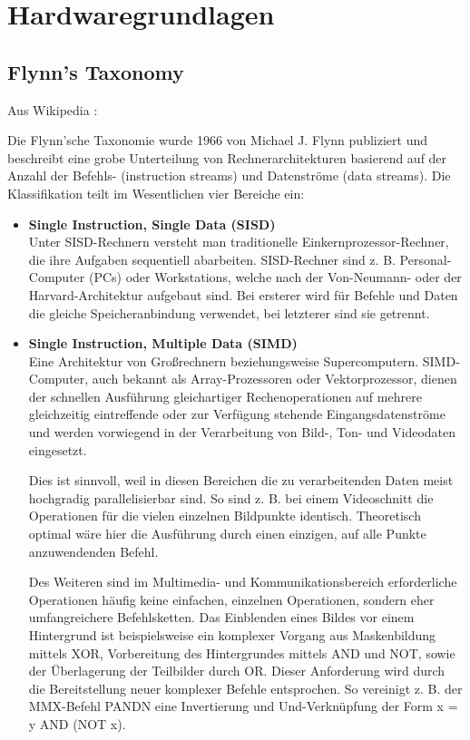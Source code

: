 	\chapter{Hardwaregrundlagen}
		\section{Flynn's Taxonomy}
		Aus Wikipedia \autocite{wikiFT}:
		
		Die Flynn’sche Taxonomie wurde 1966 von Michael J. Flynn publiziert und beschreibt eine grobe Unterteilung von Rechnerarchitekturen basierend auf der Anzahl der Befehls- (instruction streams) und Datenströme (data streams). Die Klassifikation teilt im Wesentlichen vier Bereiche ein:
		\begin{itemize}
		\item \textbf{Single Instruction, Single Data (SISD)}\\ Unter SISD-Rechnern versteht man traditionelle Einkernprozessor-Rechner, die ihre Aufgaben sequentiell abarbeiten. SISD-Rechner sind z. B. Personal-Computer (PCs) oder Workstations, welche nach der Von-Neumann- oder der Harvard-Architektur aufgebaut sind. Bei ersterer wird für Befehle und Daten die gleiche Speicheranbindung verwendet, bei letzterer sind sie getrennt. 
		
		\item \textbf{Single Instruction, Multiple Data (SIMD)}\\ Eine Architektur von Großrechnern beziehungsweise Supercomputern. SIMD-Computer, auch bekannt als Array-Prozessoren oder Vektorprozessor, dienen der schnellen Ausführung gleichartiger Rechenoperationen auf mehrere gleichzeitig eintreffende oder zur Verfügung stehende Eingangsdatenströme und werden vorwiegend in der Verarbeitung von Bild-, Ton- und Videodaten eingesetzt.

Dies ist sinnvoll, weil in diesen Bereichen die zu verarbeitenden Daten meist hochgradig parallelisierbar sind. So sind z. B. bei einem Videoschnitt die Operationen für die vielen einzelnen Bildpunkte identisch. Theoretisch optimal wäre hier die Ausführung durch einen einzigen, auf alle Punkte anzuwendenden Befehl.

Des Weiteren sind im Multimedia- und Kommunikationsbereich erforderliche Operationen häufig keine einfachen, einzelnen Operationen, sondern eher umfangreichere Befehlsketten. Das Einblenden eines Bildes vor einem Hintergrund ist beispielsweise ein komplexer Vorgang aus Maskenbildung mittels XOR, Vorbereitung des Hintergrundes mittels AND und NOT, sowie der Überlagerung der Teilbilder durch OR. Dieser Anforderung wird durch die Bereitstellung neuer komplexer Befehle entsprochen. So vereinigt z. B. der MMX-Befehl PANDN eine Invertierung und Und-Verknüpfung der Form x = y AND (NOT x).


\end{itemize}
